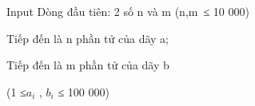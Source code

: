 Input
Dòng đầu tiên: 2 số n và m (n,m ≤ 10 000)

Tiếp đến là n phần tử của dãy a;

Tiếp đến là m phần tử của dãy b

(1 ≤$a_{i}$ , $b_{i}$ ≤ 100 000)